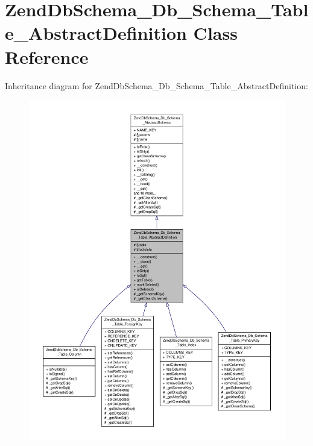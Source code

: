 \hypertarget{classZendDbSchema__Db__Schema__Table__AbstractDefinition}{\section{Zend\-Db\-Schema\-\_\-\-Db\-\_\-\-Schema\-\_\-\-Table\-\_\-\-Abstract\-Definition Class Reference}
\label{classZendDbSchema__Db__Schema__Table__AbstractDefinition}
}


Inheritance diagram for Zend\-Db\-Schema\-\_\-\-Db\-\_\-\-Schema\-\_\-\-Table\-\_\-\-Abstract\-Definition\-:\nopagebreak
\begin{figure}[H]
\begin{center}
\leavevmode
\includegraphics[width=350pt]{classZendDbSchema__Db__Schema__Table__AbstractDefinition__inherit__graph}
\end{center}
\end{figure}


